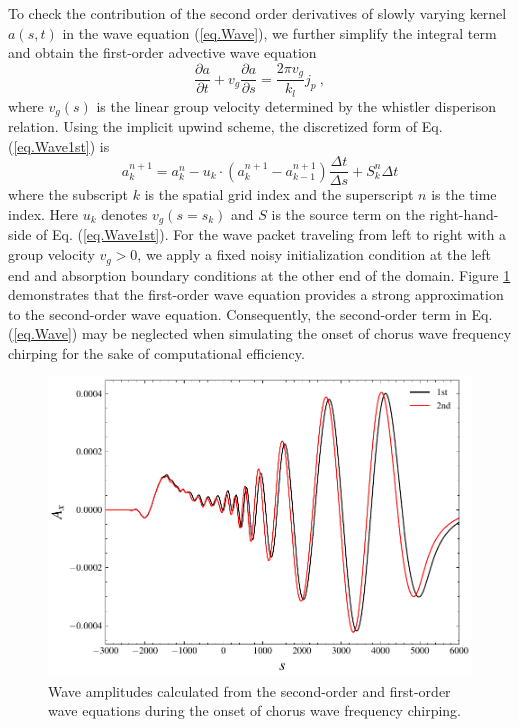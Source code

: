 To check the contribution of the second order derivatives of slowly varying kernel $a(s,t)$ in the wave equation (\ref{eq.Wave}), we further simplify the integral term and obtain the first-order advective wave equation 
\begin{equation}\label{eq.Wave1st}
    \frac{\partial a}{\partial t} + v_{g} \frac{\partial a}{\partial s} = \frac{2\pi v_g}{k_l} j_{p}~,
\end{equation}
where $v_g(s)$ is the linear group velocity determined by the whistler disperison relation.
Using the implicit upwind scheme,
 the discretized form of Eq. (\ref{eq.Wave1st})  is
\begin{equation}
a_k^{n+1} = a_k^{n} - u_{k}\cdot\left(a_{k}^{n+1}-a_{k-1}^{n+1}\right)\frac{\Delta t}{\Delta s} + S_k^n \Delta t
\end{equation}
where 
the subscript $k$ is the spatial grid index
and
the superscript $n$ is the time index.
Here 
$u_k $ denotes $ v_g(s=s_k)$ and 
$S$ is the source term on the right-hand-side of Eq. (\ref{eq.Wave1st}).
For the wave packet traveling from left to right 
with a group velocity  $v_g>0$, 
we apply 
a fixed noisy initialization condition at the left end and 
absorption boundary conditions at the other end of the domain.
Figure \ref{fig.cmp2} demonstrates that the first-order wave equation provides a strong approximation to the second-order wave equation. Consequently, the second-order term in Eq. (\ref{eq.Wave}) may be neglected when simulating the onset of chorus wave frequency chirping for the sake of computational efficiency.
\begin{figure}[htbp]
    \centering
    \includegraphics[scale=0.5]{cpc_img/fig_diff.pdf}
    \caption{ Wave amplitudes calculated from the second-order and first-order wave equations during the onset of chorus wave frequency chirping. 
    }
    \label{fig.cmp2}
\end{figure}
